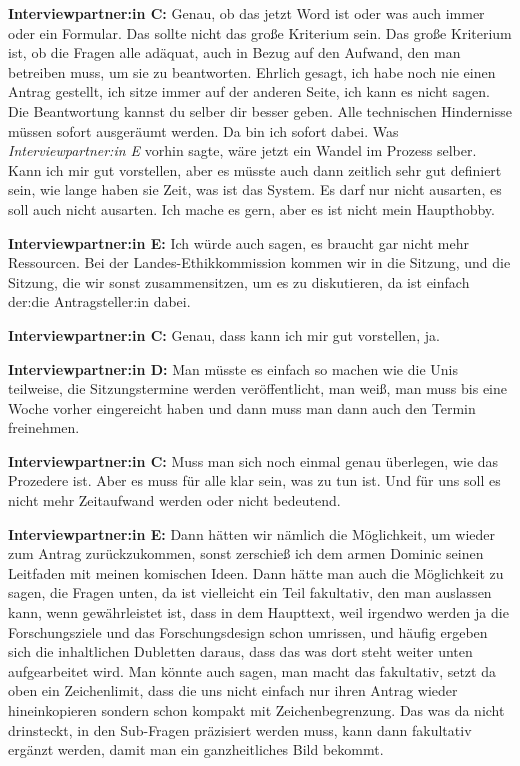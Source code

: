 \documentclass[a4paper,12pt,twoside,numbers=noendperiod]{scrreprt}
\begin{document}
\textbf{Interviewpartner:in C:} Genau, ob das jetzt Word ist oder was auch immer oder ein Formular. Das sollte nicht das große Kriterium sein. Das große Kriterium ist, ob die Fragen alle adäquat, auch in Bezug auf den Aufwand, den man betreiben muss, um sie zu beantworten. Ehrlich gesagt, ich habe noch nie einen Antrag gestellt, ich sitze immer auf der anderen Seite, ich kann es nicht sagen. Die Beantwortung kannst du selber dir besser geben. Alle technischen Hindernisse müssen sofort ausgeräumt werden. Da bin ich sofort dabei. Was \textit{Interviewpartner:in E} vorhin sagte, wäre jetzt ein Wandel im Prozess selber. Kann ich mir gut vorstellen, aber es müsste auch dann zeitlich sehr gut definiert sein, wie lange haben sie Zeit, was ist das System. Es darf nur nicht ausarten, es soll auch nicht ausarten. Ich mache es gern, aber es ist nicht mein Haupthobby.

\textbf{Interviewpartner:in E:} Ich würde auch sagen, es braucht gar nicht mehr Ressourcen. Bei der Landes-Ethikkommission kommen wir in die Sitzung, und die Sitzung, die wir sonst zusammensitzen, um es zu diskutieren, da ist einfach der:die Antragsteller:in dabei.

\textbf{Interviewpartner:in C:} Genau, dass kann ich mir gut vorstellen, ja.

\textbf{Interviewpartner:in D:} Man müsste es einfach so machen wie die Unis teilweise, die Sitzungstermine werden veröffentlicht, man weiß, man muss bis eine Woche vorher eingereicht haben und dann muss man dann auch den Termin freinehmen.

\textbf{Interviewpartner:in C:} Muss man sich noch einmal genau überlegen, wie das Prozedere ist. Aber es muss für alle klar sein, was zu tun ist. Und für uns soll es nicht mehr Zeitaufwand werden oder nicht bedeutend.

\textbf{Interviewpartner:in E:} Dann hätten wir nämlich die Möglichkeit, um wieder zum Antrag zurückzukommen, sonst zerschieß ich dem armen Dominic seinen Leitfaden mit meinen komischen Ideen. Dann hätte man auch die Möglichkeit zu sagen, die Fragen unten, da ist vielleicht ein Teil fakultativ, den man auslassen kann, wenn gewährleistet ist, dass in dem Haupttext, weil irgendwo werden ja die Forschungsziele und das Forschungsdesign schon umrissen, und häufig ergeben sich die inhaltlichen Dubletten daraus, dass das was dort steht weiter unten aufgearbeitet wird. Man könnte auch sagen, man macht das fakultativ, setzt da oben ein Zeichenlimit, dass die uns nicht einfach nur ihren Antrag wieder hineinkopieren sondern schon kompakt mit Zeichenbegrenzung. Das was da nicht drinsteckt, in den Sub-Fragen präzisiert werden muss, kann dann fakultativ ergänzt werden, damit man ein ganzheitliches Bild bekommt.
\end{document}
